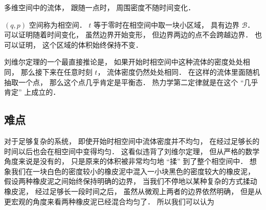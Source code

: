 
\begin{issues}
\issueDraft
\end{issues}

多维空间中的流体， 跟随一点时， 周围密度不随时间变化．

$(q, p)$ 空间称为相空间． $t$ 等于零时在相空间中取一块小区域， 具有边界 $\mathcal B$． 可以证明随着时间变化， 虽然边界开始变形， 但边界两边的点不会跨越边界． 也可以证明， 这个区域的体积始终保持不变．

刘维尔定理的一个最直接推论是， 如果开始时相空间中这种流体的密度处处相同， 那么接下来在任意时刻 $t$， 流体密度仍然处处相同． 在这样的流体里面随机抽取一个点， 那么这个点几乎肯定是平衡态． 热力学第二定律就是在这个 “几乎肯定” 上成立的．

\subsection{难点}
对于足够复杂的系统， 即使开始时相空间中流体密度并不均匀， 在经过足够长的时间以后也会在相空间中变得均匀． 这看似违背了刘维尔定理， 但从严格的数学角度来说是没有的， 只是原来的体积被非常均匀地 “揉” 到了整个相空间中． 想象我们在一块白色的密度较小的橡皮泥中混入一小块黑色的密度较大的橡皮泥， 假设两种橡皮泥之间始终保持明确的边界， 当我们不停地以某种复杂的方式揉动橡皮泥， 经过足够长一段时间之后， 虽然从微观上两者的边界依然明确， 但是从更宏观的角度来看两种橡皮泥已经混合均匀了． 所以我们可以认为
